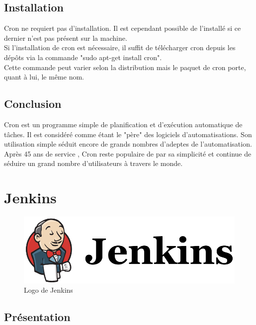 \documentclass[12pt]{article}
\begin{document}
\subsection{Installation}
Cron ne requiert pas d'installation. Il est cependant possible de l'installé si ce dernier n'est pas présent sur la machine. 
\\
Si l'installation de cron est nécessaire, il suffit de télécharger cron depuis les dépôts via la commande "sudo apt-get install cron".
\\
Cette commande peut varier selon la distribution mais le paquet de cron porte, quant à lui, le même nom.

\subsection{Conclusion}
Cron est un programme simple de planification et d'exécution automatique de tâches. Il est considéré comme étant le "père" des logiciels d'automatisations. Son utilisation simple séduit encore de grands nombres d'adeptes de l'automatisation.
\\
Après 45 ans de service , Cron reste populaire de par sa simplicité et continue de séduire un grand nombre d'utilisateurs à travers le monde.

\section{Jenkins}

\begin{figure}[ht]
    \includegraphics[scale=0.5]{images/jenkins.png}
    \caption{Logo de Jenkins}
\end{figure}

\subsection{Présentation}
\end{document}
